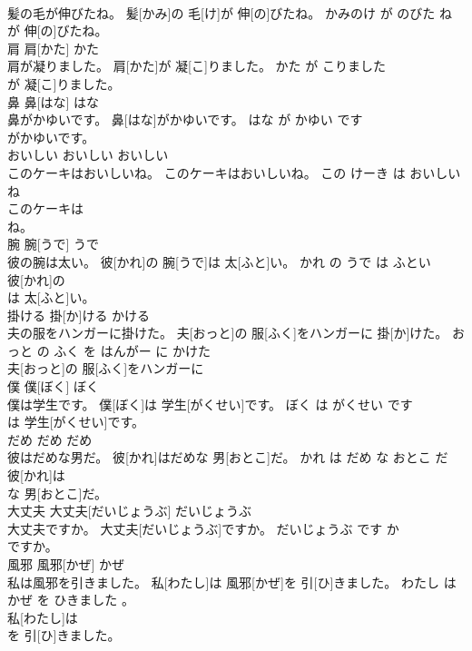 \documentclass[8pt]{extreport}
\begin{document}
\begin{CJK}{UTF8}{min}
\\	髪の毛が伸びたね。	髪[かみ]の 毛[け]が 伸[の]びたね。	かみのけ が のびた ね	
\\	が 伸[の]びたね。		
\\	肩	肩[かた]	かた	
\\	肩が凝りました。	肩[かた]が 凝[こ]りました。	かた が こりました	
\\	が 凝[こ]りました。		
\\	鼻	鼻[はな]	はな	
\\	鼻がかゆいです。	鼻[はな]がかゆいです。	はな が かゆい です	
\\	がかゆいです。		
\\	おいしい	おいしい	おいしい	
\\	このケーキはおいしいね。	このケーキはおいしいね。	この けーき は おいしい ね	
\\	このケーキは
\\	ね。		
\\	腕	腕[うで]	うで	
\\	彼の腕は太い。	彼[かれ]の 腕[うで]は 太[ふと]い。	かれ の うで は ふとい	
\\	彼[かれ]の
\\	は 太[ふと]い。		
\\	掛ける	掛[か]ける	かける	
\\	夫の服をハンガーに掛けた。	夫[おっと]の 服[ふく]をハンガーに 掛[か]けた。	おっと の ふく を はんがー に かけた	
\\	夫[おっと]の 服[ふく]をハンガーに
\\	僕	僕[ぼく]	ぼく	
\\	僕は学生です。	僕[ぼく]は 学生[がくせい]です。	ぼく は がくせい です	
\\	は 学生[がくせい]です。		
\\	だめ	だめ	だめ	
\\	彼はだめな男だ。	彼[かれ]はだめな 男[おとこ]だ。	かれ は だめ な おとこ だ	
\\	彼[かれ]は
\\	な 男[おとこ]だ。		
\\	大丈夫	大丈夫[だいじょうぶ]	だいじょうぶ	
\\	大丈夫ですか。	大丈夫[だいじょうぶ]ですか。	だいじょうぶ です か	
\\	ですか。		
\\	風邪	風邪[かぜ]	かぜ	
\\	私は風邪を引きました。	私[わたし]は 風邪[かぜ]を 引[ひ]きました。	わたし は かぜ を ひきました 。	
\\	私[わたし]は
\\	を 引[ひ]きました。		

\end{CJK}
\end{document}
